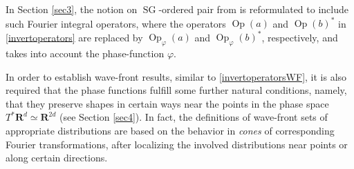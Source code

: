 \documentclass[12pt,a4paper,reqno]{amsart}
\numberwithin{equation}{section}
\numberwithin{thm}{section}
\theoremstyle{definition}
\theoremstyle{remark}
\begin{document}
\par

In Section \ref{sec3}, the notion on ${\operatorname{SG}}$-ordered
pair from \cite{CJT2} is reformulated to include such Fourier integral operators,
where the operators ${\operatorname{Op}} (a)$ and ${\operatorname{Op}} (b)^*$ in \eqref{invertoperators} are
replaced by ${\operatorname{Op}} _{\varphi}(a)$ and ${\operatorname{Op}} _{\varphi}(b)^*$, respectively, and takes into
account the phase-function $\varphi$.

\par

In order to establish wave-front results, similar to
\eqref{invertoperatorsWF}, it is also required that the phase functions
fulfill some further natural conditions, namely, that they preserve shapes in
certain ways near the points in the phase space $T^*{\mathbf R^{{d}}}\simeq {\mathbf R^{{2d}}}$
(see Section \ref{sec4}).
In fact, the definitions of wave-front sets of appropriate distributions
are based on the behavior in \emph{cones} of corresponding Fourier
transformations, after localizing the involved distributions near points or
along certain directions. 

\par
\end{document}
